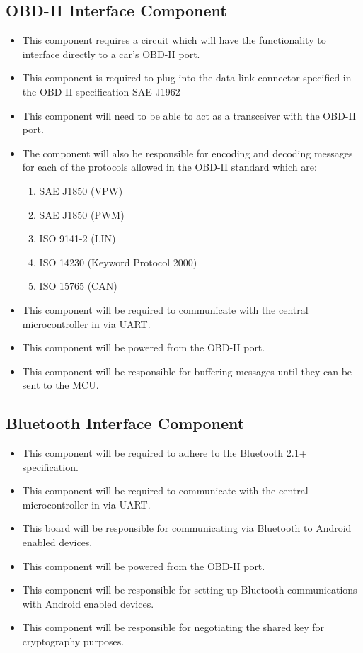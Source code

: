 \documentclass[12pt,letterpaper]{article}
\begin{document}
\subsection{OBD-II Interface Component}
\begin{itemize}
	\item This component requires a circuit which will have the functionality to interface directly to a car's OBD-II port. 
	\item This component is required to plug into the data link connector specified in the OBD-II specification SAE J1962
	\item This component will need to be able to act as a transceiver with the OBD-II port.
	\item The component will also be responsible for encoding and decoding messages for each of the protocols allowed in the OBD-II standard which are:
	\begin{enumerate}
		\item SAE J1850 (VPW)
		\item SAE J1850 (PWM)
		\item ISO 9141-2  (LIN)
		\item ISO 14230 (Keyword Protocol 2000)
		\item ISO 15765 (CAN)
	\end{enumerate}
	\item This component will be required to communicate with the central microcontroller in via UART.
	\item This component will be powered from the OBD-II port.
	\item This component will be responsible for buffering messages until they can be sent to the MCU.
\end{itemize}

\subsection{Bluetooth Interface Component}
\begin{itemize}
	\item This component will be required to adhere to the Bluetooth 2.1+ specification.
	\item This component will be required to communicate with the central microcontroller in via UART.
	\item This board will be responsible for communicating via Bluetooth to Android enabled devices.
	\item This component will be powered from the OBD-II port.
	\item This component will be responsible for setting up Bluetooth communications with Android enabled devices.
	\item This component will be responsible for negotiating the shared key for cryptography purposes.
\end{itemize}
\end{document}
